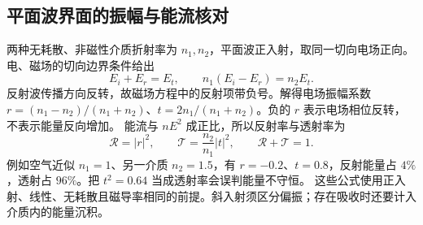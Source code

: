 \subsection{平面波界面的振幅与能流核对}
两种无耗散、非磁性介质折射率为 $n_1,n_2$，平面波正入射，取同一切向电场正向。电、磁场的切向边界条件给出
\[
 E_i+E_r=E_t,\qquad n_1(E_i-E_r)=n_2E_t.
\]
反射波传播方向反转，故磁场方程中的反射项带负号。解得电场振幅系数
$r=(n_1-n_2)/(n_1+n_2)$、$t=2n_1/(n_1+n_2)$。负的 $r$ 表示电场相位反转，不表示能量反向增加。
能流与 $nE^2$ 成正比，所以反射率与透射率为
\[
 \mathcal R=|r|^2,\qquad \mathcal T=\frac{n_2}{n_1}|t|^2,
 \qquad \mathcal R+\mathcal T=1.
\]
例如空气近似 $n_1=1$、另一介质 $n_2=1.5$，有 $r=-0.2$、$t=0.8$，反射能量占 $4\%$，透射占 $96\%$。把 $t^2=0.64$ 当成透射率会误判能量不守恒。
这些公式使用正入射、线性、无耗散且磁导率相同的前提。斜入射须区分偏振；存在吸收时还要计入介质内的能量沉积。

